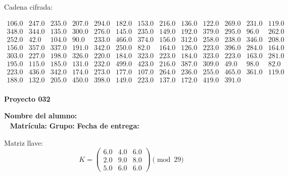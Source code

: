\documentclass[12pt]{article}
\begin{document}
Cadena cifrada:
\begin{center}
$\begin{array}{lllllllllllll}
106.0 & 247.0 & 235.0 & 207.0 & 294.0 & 182.0 & 153.0 & 216.0 & 136.0 & 122.0 & 269.0 & 231.0 & 119.0\\
348.0 & 344.0 & 135.0 & 300.0 & 276.0 & 145.0 & 235.0 & 149.0 & 192.0 & 379.0 & 295.0 & 96.0 & 262.0\\
252.0 & 42.0 & 104.0 & 90.0 & 233.0 & 466.0 & 374.0 & 156.0 & 312.0 & 258.0 & 238.0 & 346.0 & 208.0\\
156.0 & 357.0 & 337.0 & 191.0 & 342.0 & 250.0 & 82.0 & 164.0 & 126.0 & 223.0 & 396.0 & 284.0 & 164.0\\
303.0 & 227.0 & 198.0 & 326.0 & 220.0 & 184.0 & 323.0 & 223.0 & 184.0 & 323.0 & 223.0 & 163.0 & 281.0\\
195.0 & 115.0 & 185.0 & 131.0 & 232.0 & 499.0 & 423.0 & 216.0 & 387.0 & 309.0 & 49.0 & 98.0 & 82.0\\
223.0 & 436.0 & 342.0 & 174.0 & 273.0 & 177.0 & 107.0 & 264.0 & 236.0 & 255.0 & 465.0 & 361.0 & 119.0\\
188.0 & 132.0 & 205.0 & 450.0 & 398.0 & 149.0 & 223.0 & 137.0 & 172.0 & 419.0 & 391.0\\
\end{array}$
\end{center}

\newpage


\textbf{Proyecto 032}

\textbf{Nombre del alumno:} \underline{\hspace{13cm}}\\\
\vspace{1cm}
\textbf{Matrícula:} \underline{\hspace{4cm}} \hspace{1cm}
\textbf{Grupo:} \underline{\hspace{2cm}}
\textbf{Fecha de entrega:} \underline{\hspace{2cm}}

\medskip

Matriz llave:
\[
K = \begin{pmatrix}
6.0 & 4.0 & 6.0\\
2.0 & 9.0 & 8.0\\
5.0 & 6.0 & 6.0
\end{pmatrix} \pmod{29}
\]
\end{document}
